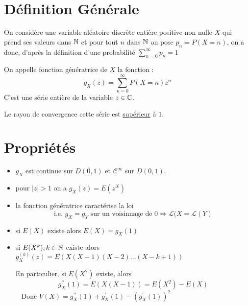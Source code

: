 
\minitoc  %

\section*{Définition Générale}

On considère une variable aléatoire discrète entière positive non nulle $X$ qui prend ses valeurs dans $\mathbb{N}$ et pour tout $n$ dans $\mathbb{N}$ on pose 
$p_n = P(X = n)$, on a donc, d'après la définition d'une probabilité $ \sum_{n=0}^{\infty} p_n = 1 $

\begin{definition}
    On appelle fonction génératrice de $X$ la fonction :
        \[ \boxed{ g_X(z) = \sum_{n=0}^{\infty} P(X = n) z^n} \] 
    C'est une série entière de la variable $z \in \mathbb{C}$.    
\end{definition}

\begin{remark}
    Le rayon de convergence cette série est \underline{supérieur} à $1$.
\end{remark}

\section*{Propriétés}

\begin{itemize}
    \item $g_X$ est continue sur $ \overline{D(0, 1)}$ et $\mathcal{C}^\infty$ sur $D(0, 1)$.
    \item pour $|z| > 1$ on a $g_X(z) = E(z^X)$
    \item la fonction génératrice caractérise la loi 
        \[ \text{i.e. } g_X = g_Y \text{ sur un voisinnage de 0} \Longrightarrow \mathcal{L}(X = \mathcal{L}(Y) \] 
    \item si $E(X)$ existe alors $E(X) = g_X(1)$ 
    \item si $E(X^k), k \in \mathbb{N}$ existe alors $g_X^{(k)}(z) = E(X(X-1)(X-2) \dots (X - k + 1))$ 
        
        En particulier, si $E(X^2)$ existe, alors 
            \[ g_X^{\prime \prime}(1) = E(X(X-1)) = E(X^2) - E(X) \] 
        Donc $ V(X) = g_X^{\prime \prime}(1) + g_X^{\prime}(1) - (g_X^{\prime}(1))^2 $
\end{itemize}


